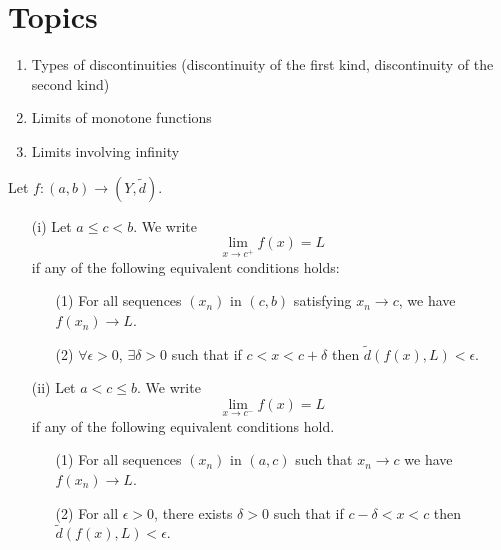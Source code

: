 \documentclass[a4paper]{article}
\begin{document}
\section{Topics}

\begin{enumerate}
    \item Types of discontinuities (discontinuity of the first kind, discontinuity of the second kind)
    \item Limits of monotone functions
    \item Limits involving infinity
\end{enumerate}

\begin{definition}
    Let \( f: (a,b) \to (Y, \tilde{d}) \). 
    \begin{enumerate}
        \item[(i)] Let \( a \leq c < b \). We write
            \[  \lim_{ x \to c^{+} } f(x) = L \]
            if any of the following equivalent conditions holds:
            \begin{enumerate}
                \item[(1)] For all sequences \( ({x}_{n}) \) in \( (c,b) \) satisfying \( {x}_{n} \to c  \), we have \( f({x}_{n}) \to L \).
                \item[(2)] \( \forall \epsilon > 0  \), \( \exists \delta > 0  \) such that if \( c < x < c + \delta  \) then \( \tilde{d}(f(x), L) < \epsilon \).
            \end{enumerate}
        \item[(ii)] Let \( a < c \leq b  \). We write
            \[  \lim_{ x \to c^{-} }  f(x) = L \]
            if any of the following equivalent conditions hold.
            \begin{enumerate}
                \item[(1)] For all sequences \( ({x}_{n}) \) in \( (a,c) \) such that \( {x}_{n} \to c  \) we have \( f({x}_{n}) \to L  \).
                \item[(2)] For all \( \epsilon > 0  \), there exists \( \delta > 0  \) such that if \( c - \delta < x < c  \) then \( \tilde{d}(f(x), L) < \epsilon \). 
            \end{enumerate} 
    \end{enumerate}
\end{definition}
\end{document}
